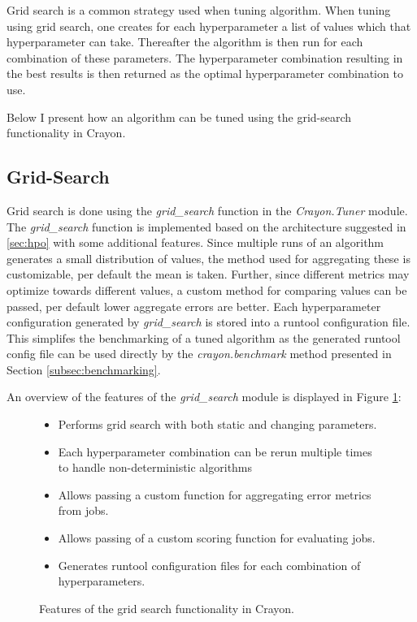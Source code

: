 Grid search is a common strategy used when tuning algorithm. When tuning using grid search, one creates for each hyperparameter a list of values which that hyperparameter can take. Thereafter the algorithm is then run for each combination of these parameters. The hyperparameter combination resulting in the best results is then returned as the optimal hyperparameter combination to use.

Below I present how an algorithm can be tuned using the grid-search functionality in Crayon.

\subsection{Grid-Search}
Grid search is done using the \textit{grid\_search} function in the \textit{Crayon.Tuner} module. The \textit{grid\_search} function is implemented based on the architecture suggested in \ref{sec:hpo} with some additional features. Since multiple runs of an algorithm generates a small distribution of values, the method used for aggregating these is customizable, per default the mean is taken. Further, since different metrics may optimize towards different values, a custom method for comparing values can be passed, per default lower aggregate errors are better. Each hyperparameter configuration generated by \textit{grid\_search} is stored into a runtool configuration file. This simplifes the benchmarking of a tuned algorithm as the generated runtool config file can be used directly by the \textit{crayon.benchmark} method presented in Section \ref{subsec:benchmarking}.

An overview of the features of the \textit{grid\_search} module is displayed in Figure \ref{features_grid_search}:

\begin{figure}[h]
  \begin{itemize}
    \item Performs grid search with both static and changing parameters.
    \item Each hyperparameter combination can be rerun multiple times to handle non-deterministic algorithms
    \item Allows passing a custom function for aggregating error metrics from jobs.
    \item Allows passing of a custom scoring function for evaluating jobs.
    \item Generates runtool configuration files for each combination of hyperparameters.
  \end{itemize}
  \caption{Features of the grid search functionality in Crayon.}
  \label{features_grid_search}
\end{figure}


